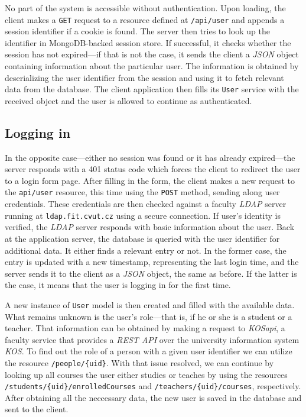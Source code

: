 \documentclass[thesis=M,english,hidelinks]{FITthesis}[2012/10/20]
\newcommand{\code}{\texttt}
\begin{document}
No part of the system is accessible without authentication. Upon loading, the client makes a \code{GET} request to a resource defined at \code{/api/user} and appends a session identifier if a cookie is found. The server then tries to look up the identifier in MongoDB-backed session store. If successful, it checks whether the session has not expired---if that is not the case, it sends the client a \textit{JSON} object containing information about the particular user. The information is obtained by deserializing the user identifier from the session and using it to fetch relevant data from the database. The client application then fills its \code{User} service with the received object and the user is allowed to continue as authenticated.

\subsection{Logging in}

In the opposite case---either no session was found or it has already expired---the server responds with a 401 status code which forces the client to redirect the user to a login form page. After filling in the form, the client makes a new request to the \code{api/user} resource, this time using the \code{POST} method, sending along user credentials. These credentials are then checked against a faculty \textit{LDAP} server running at \code{ldap.fit.cvut.cz} using a secure connection. If user's identity is verified, the \textit{LDAP} server responds with basic information about the user. Back at the application server, the database is queried with the user identifier for additional data. It either finds a relevant entry or not. In the former case, the entry is updated with a new timestamp, representing the last login time, and the server sends it to the client as a \textit{JSON} object, the same as before. If the latter is the case, it means that the user is logging in for the first time.

A new instance of \code{User} model is then created and filled with the available data. What remains unknown is the user's role---that is, if he or she is a student or a teacher. That information can be obtained by making a request to \textit{KOSapi}, a faculty service that provides a \textit{REST API} over the university information system \textit{KOS}. To find out the role of a person with a given user identifier we can utilize the resource \code{/people/\{uid\}}. With that issue resolved, we can continue by looking up all courses the user either studies or teaches by using the resources \code{/students/\{uid\}/enrolledCourses} and \code{/teachers/\{uid\}/courses}, respectively. After obtaining all the neccessary data, the new user is saved in the database and sent to the client.
\end{document}
